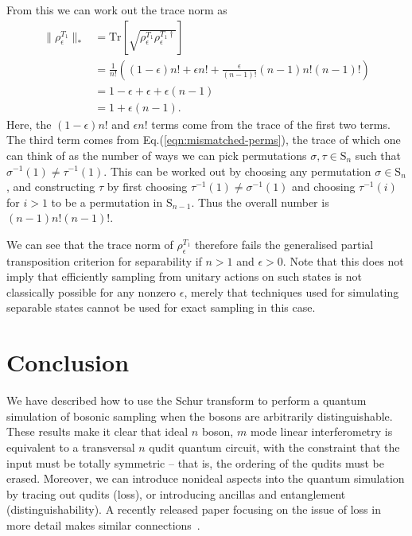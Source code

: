From this we can work out the trace norm as
\begin{align}
\|\rho_{\epsilon}^{T_1}\|_*
 &= \textrm{Tr}\left[\sqrt{\rho_\epsilon^{T_1}\rho_\epsilon^{T_1\dagger}}\right]\\
 &= \frac{1}{n!}\left((1-\epsilon)n! + \epsilon n! + \frac{\epsilon}{(n-1)!}(n-1)n!(n-1)!\right)\\
 &= 1-\epsilon + \epsilon+\epsilon(n-1)\\
 &= 1+\epsilon(n-1).
\end{align}
Here, the $(1-\epsilon)n!$ and $\epsilon n!$ terms come from the trace of the first two terms. 
The third term comes from Eq.(\ref{eqn:mismatched-perms}), the trace of which one can think of as the number of ways we can pick permutations $\sigma,\tau\in\textrm{S}_n$ such that $\sigma^{-1}(1)\neq\tau^{-1}(1)$. 
This can be worked out by choosing any permutation $\sigma \in \textrm{S}_n$, and constructing $\tau$ by first choosing $\tau^{-1}(1)\neq\sigma^{-1}(1)$ and choosing $\tau^{-1}(i)$ for $i>1$ to be a permutation in $\textrm{S}_{n-1}$. 
Thus the overall number is $(n-1)n!(n-1)!$.

We can see that the trace norm of $\rho_\epsilon^{T_1}$ therefore fails the generalised partial transposition criterion for separability if $n>1$ and $\epsilon>0$.
Note that this does not imply that efficiently sampling from unitary actions on such states is not classically possible for any nonzero $\epsilon$, merely that techniques used for simulating separable states cannot be used for exact sampling in this case.



\section{Conclusion}
\label{sec:nc-conclusion}

We have described how to use the Schur transform to perform a quantum simulation of bosonic sampling when the bosons are arbitrarily distinguishable.
These results make it clear that ideal $n$ boson, $m$ mode linear interferometry is equivalent to a transversal $n$ qudit quantum circuit, with the constraint that the input must be totally symmetric -- that is, the ordering of the qudits must be erased.
Moreover, we can introduce nonideal aspects into the quantum simulation by tracing out qudits (loss), or introducing ancillas and entanglement (distinguishability).
A recently released paper focusing on the issue of loss in more detail makes similar connections~\cite{oszmaniec2018}.

